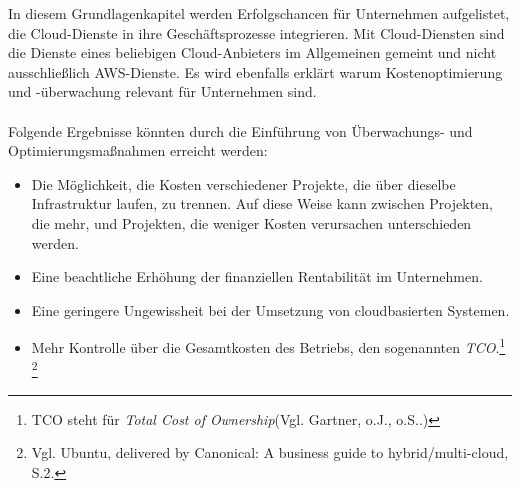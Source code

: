 In diesem Grundlagenkapitel werden Erfolgschancen für Unternehmen aufgelistet, die Cloud-Dienste in ihre Geschäftsprozesse integrieren. Mit Cloud-Diensten sind die Dienste eines beliebigen Cloud-Anbieters im Allgemeinen gemeint und nicht ausschließlich AWS-Dienste. 
Es wird ebenfalls erklärt warum Kostenoptimierung und -überwachung relevant für Unternehmen sind.
\\\\
Folgende Ergebnisse könnten durch die Einführung von Überwachungs- und Optimierungsmaßnahmen erreicht werden:
\begin{itemize}
      \item
            Die Möglichkeit, die Kosten verschiedener Projekte, die über dieselbe Infrastruktur laufen, zu trennen.
            Auf diese Weise kann zwischen Projekten, die mehr, und Projekten, die weniger Kosten verursachen unterschieden werden.%
      \item
            Eine beachtliche Erhöhung der finanziellen Rentabilität im Unternehmen.%
      \item
            Eine geringere Ungewissheit bei der Umsetzung von cloudbasierten Systemen.
      \item
            Mehr Kontrolle über die Gesamtkosten des Betriebs, den sogenannten \textit{TCO}.\footnote{TCO steht für \textit{Total Cost of Ownership}(Vgl. Gartner, o.J., o.S.\cite{TCO}.)}{ }\footnote{Vgl. Ubuntu, delivered by Canonical: A business guide to hybrid/multi-cloud, S.2.\cite{CAN01}}

\end{itemize}



